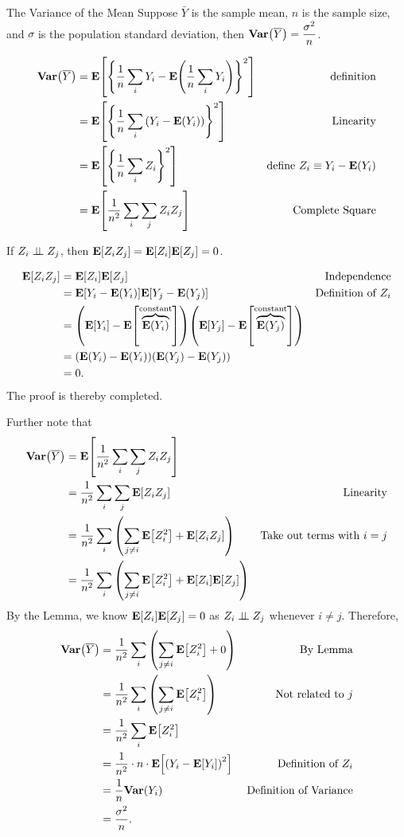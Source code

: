 \begin{thm}{The Variance of the Mean}
	Suppose $\bar Y$ is the sample mean, $n$ is the sample size, and $\sigma$ is the population standard deviation, then  $\vb{Var}\qty(\overline Y)=\dfrac{\sigma^2}{n}$.
\end{thm}
\begin{prf}
	\begin{align*}
		\vb{Var}\qty(\overline{Y})&=\vb{E}\qty[\qty{\dfrac{1}{n}\sum_iY_i-\vb{E}\qty(\dfrac{1}{n}\sum_iY_i)}^2]&\text{definition}\\
		&=\vb{E}\qty[\qty{\dfrac{1}{n}\sum_i\qty(Y_i-\vb{E}\qty(Y_i))}^2]&\text{Linearity}\\
		&=\vb{E}\qty[\qty{\dfrac{1}{n}\sum_iZ_i}^2]&\text{define }Z_i\equiv Y_i-\vb{E}\qty(Y_i)\\
		&=\vb{E}\qty[\dfrac{1}{n^2}\sum_i\sum_jZ_iZ_j]&\text{Complete Square}
	\end{align*}
	\begin{lem*} If $Z_i\perp\!\!\!\perp Z_j$, then $\vb{E}\qty[Z_iZ_j]=\vb{E}[Z_i]\vb{E}[Z_j]=0$.
	\begin{prf*}
		\begin{align*}
			\vb{E}\qty[Z_iZ_j]&=\vb{E}[Z_i]\vb{E}[Z_j]&\text{Independence}\\
			&=\vb{E}\qty[Y_i-\vb{E}\qty(Y_i)]\vb{E}\qty[Y_j-\vb{E}\qty(Y_j)]&\text{Definition of $Z_i$}\\
			&=\qty(\vb{E}\qty[Y_i]-\vb{E}\qty[\overbrace{\vb{E}\qty(Y_i)}^\text{constant}])\qty(\vb{E}\qty[Y_j]-\vb{E}\qty[\overbrace{\vb{E}\qty(Y_j)}^\text{constant}])\\
			&=\qty(\vb{E}(Y_i)-\vb{E}(Y_i))\qty(\vb{E}(Y_j)-\vb{E}(Y_j))\\
			&=0.
		\end{align*}
		 The proof is thereby completed.
	\end{prf*}
	\end{lem*}
Further note that \begin{align*}
	\vb{Var}\qty(\overline{Y})&=\vb{E}\qty[\dfrac{1}{n^2}\sum_i\sum_jZ_iZ_j]\\
	&=\dfrac{1}{n^2}\sum_i\sum_j\vb{E}[Z_iZ_j]&\text{Linearity}\\
	&=\dfrac{1}{n^2}\sum_i\qty(\sum_{j\neq i}\vb{E}\qty[Z_i^2]+\vb{E}[Z_iZ_j])&\text{Take out terms with $i=j$}\\
	&=\dfrac{1}{n^2}\sum_i\qty(\sum_{j\neq i}\vb{E}\qty[Z_i^2]+\vb{E}[Z_i]\vb{E}[Z_j])
\end{align*}
By the Lemma, we know $\vb{E}[Z_i]\vb{E}[Z_j]=0$ as $Z_i\perp\!\!\!\perp Z_j$ whenever $i\neq j$. Therefore, \begin{align*}
	\vb{Var}\qty(\overline{Y})&=\dfrac{1}{n^2}\sum_i\qty(\sum_{j\neq i}\vb{E}\qty[Z_i^2]+0)&\text{By Lemma}\\
	&=\dfrac{1}{n^2}\sum_i\qty(\sum_{j\neq i}\vb{E}\qty[Z_i^2])&\text{Not related to $j$}\\
	&=\dfrac{1}{n^2}\sum_i\vb{E}\qty[Z_i^2]\\
	&=\dfrac{1}{n^2}\cdot n\cdot\vb{E}\qty[\qty(Y_i-\vb{E}[Y_i])^2]&\text{Definition of $Z_i$}\\
	&=\dfrac{1}{n}\vb{Var}\qty(Y_i)&\text{Definition of Variance}\\
	&=\dfrac{\sigma^2}{n}.
\end{align*}
\end{prf}
